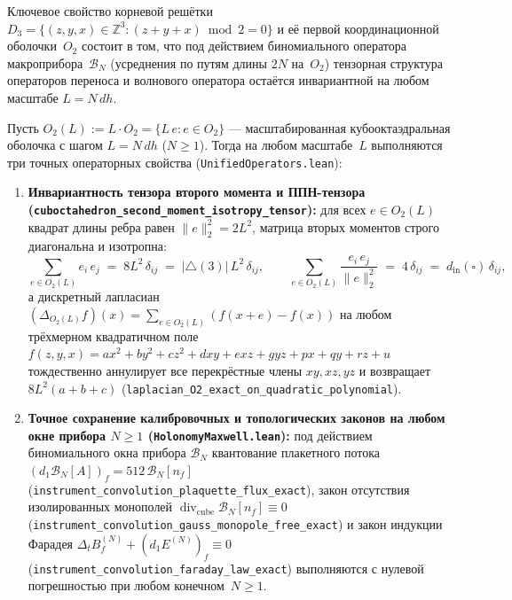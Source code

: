 Ключевое свойство корневой решётки $D_3 = \{(z,y,x)\in\mathbb{Z}^3 : (z+y+x)\bmod 2 = 0\}$ и её первой координационной оболочки~$O_2$ состоит в том, что под действием биномиального оператора макроприбора~$\mathcal{B}_N$ (усреднения по путям длины $2N$ на~$O_2$) тензорная структура операторов переноса и волнового оператора остаётся инвариантной на любом масштабе $L = N\,dh$.

\begin{theorem}
\label{thm:applied-scale-invariance}
Пусть $O_2(L) := L\cdot O_2 = \{L\,e : e\in O_2\}$ --- масштабированная кубооктаэдральная оболочка с шагом $L = N\,dh$ ($N\ge 1$). Тогда на любом масштабе~$L$ выполняются три точных операторных свойства (\texttt{UnifiedOperators.lean}):
\begin{enumerate}[leftmargin=*]
\item \textbf{Инвариантность тензора второго момента и ППН-тензора (\texttt{cuboctahedron\_\allowbreak second\_\allowbreak moment\_\allowbreak isotropy\_\allowbreak tensor}):}
  для всех $e\in O_2(L)$ квадрат длины ребра равен $\|e\|_2^2 = 2L^2$, матрица вторых моментов строго диагональна и изотропна:
  \begin{equation}
  \label{eq:applied-second-moment-L}
    \sum_{e\in O_2(L)} e_i\,e_j \;=\; 8L^2\,\delta_{ij} \;=\; |\triangle(3)|\,L^2\,\delta_{ij},
    \qquad
    \sum_{e\in O_2(L)} \frac{e_i\,e_j}{\|e\|_2^2} \;=\; 4\,\delta_{ij} \;=\; d_{\mathrm{in}}(\square)\,\delta_{ij},
  \end{equation}
  а дискретный лапласиан $(\Delta_{O_2(L)} f)(x) = \sum_{e\in O_2(L)}(f(x+e)-f(x))$ на любом трёхмерном квадратичном поле $f(z,y,x) = ax^2+by^2+cz^2+dxy+exz+gyz+px+qy+rz+u$ тождественно аннулирует все перекрёстные члены $xy,xz,yz$ и возвращает $8L^2(a+b+c)$ (\texttt{laplacian\_\allowbreak O2\_\allowbreak exact\_\allowbreak on\_\allowbreak quadratic\_\allowbreak polynomial}).
\item \textbf{Точное сохранение калибровочных и топологических законов на любом окне прибора $N\ge 1$ (\texttt{HolonomyMaxwell.lean}):}
  под действием биномиального окна прибора $\mathcal{B}_N$ квантование плакетного потока $(d_1\mathcal{B}_N[A])_f = 512\,\mathcal{B}_N[n_f]$ (\texttt{instrument\_\allowbreak convolution\_\allowbreak plaquette\_\allowbreak flux\_\allowbreak exact}), закон отсутствия изолированных монополей $\operatorname{div}_{\mathrm{cube}}\mathcal{B}_N[n_f] \equiv 0$ (\texttt{instrument\_\allowbreak convolution\_\allowbreak gauss\_\allowbreak monopole\_\allowbreak free\_\allowbreak exact}) и закон индукции Фарадея $\Delta_t B_f^{(N)} + (d_1 E^{(N)})_f \equiv 0$ (\texttt{instrument\_\allowbreak convolution\_\allowbreak faraday\_\allowbreak law\_\allowbreak exact}) выполняются с нулевой погрешностью при любом конечном~$N\ge 1$.

\end{enumerate}
\end{theorem}
